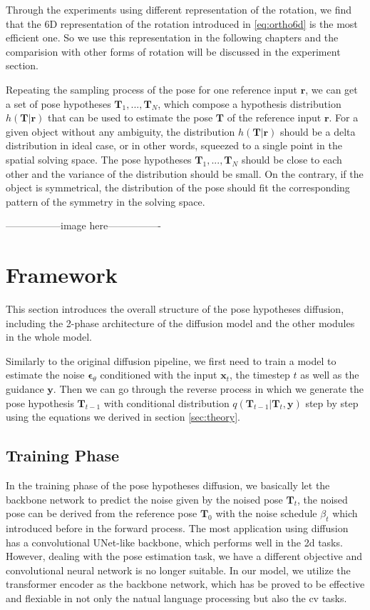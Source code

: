 \documentclass[12pt,DIV14,BCOR12mm,a4paper,footinclude=false,headinclude,parskip=half-,twoside,openright,cleardoublepage=empty,toc=index,bibliography=totoc,listof=totoc]{scrreprt}
\numberwithin{equation}{chapter}
\begin{document}
Through the experiments using different representation of the rotation, we find that the 6D representation of the rotation introduced in \ref{eq:ortho6d} is the most efficient one. So we use this representation in the following chapters and the comparision with other forms of rotation will be discussed in the experiment section.

Repeating the sampling process of the pose for one reference input $\mathbf{r}$, we can get a set of pose hypotheses $\mathbf{T}_{1},...,\mathbf{T}_{N}$, which compose a hypothesis distribution $h(\mathbf{T}|\mathbf{r})$ that can be used to estimate the pose $\mathbf{T}$ of the reference input $\mathbf{r}$. For a given object without any ambiguity, the distribution $h(\mathbf{T}|\mathbf{r})$ should be a delta distribution in ideal case, or in other words, squeezed to a single point in the spatial solving space. The pose hypotheses $\mathbf{T}_{1},...,\mathbf{T}_{N}$ should be close to each other and the variance of the distribution should be small. On the contrary, if the object is symmetrical, the distribution of the pose should fit the corresponding pattern of the symmetry in the solving space. 

-----------------image here----------------

\section{Framework}
This section introduces the overall structure of the pose hypotheses diffusion, including the 2-phase architecture of the diffusion model and the other modules in the whole model.

Similarly to the original diffusion pipeline, we first need to train a model to estimate the noise $\boldsymbol{\epsilon}_{\theta}$ conditioned with the input $\mathbf{x}_{t}$, the timestep $t$ as well as the guidance $\mathbf{y}$. Then we can go through the reverse process in which we generate the pose hypothesis $\mathbf{T}_{t-1}$ with conditional distribution $q(\mathbf{T}_{t-1}|\mathbf{T}_{t},\mathbf{y})$ step by step using the equations we derived in section \ref{sec:theory}.
\subsection{Training Phase}
In the training phase of the pose hypotheses diffusion, we basically let the backbone network to predict the noise given by the noised pose $\mathbf{T}_{t}$, the noised pose can be derived from the reference pose $\mathbf{T}_{0}$ with the noise schedule $\beta_{t}$ which introduced before in the forward process. The most application using diffusion has a convolutional UNet-like backbone\cite{ronneberger2015unet}, which performs well in the \gls{2d} tasks. However, dealing with the pose estimation task, we have a different objective and convolutional neural network is no longer suitable. In our model, we utilize the transformer encoder as the backbone network, which has be proved to be effective and flexiable in not only the natual language processing but also the \gls{cv} tasks.
\end{document}
